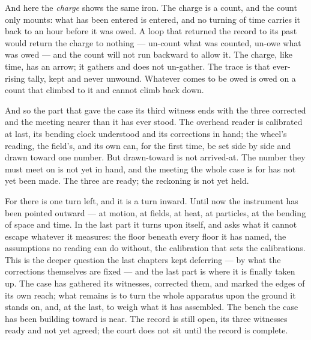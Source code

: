 And here the \emph{charge} shows the same iron. The charge is a count, and the count only mounts: what has been
entered is entered, and no turning of time carries it back to an hour before it was owed. A loop that returned
the record to its past would return the charge to nothing --- un-count what was counted, un-owe what was owed
--- and the count will not run backward to allow it. The charge, like time, has an arrow; it gathers and does
not un-gather. The trace is that ever-rising tally, kept and never unwound. Whatever comes to be owed is owed on
a count that climbed to it and cannot climb back down.

And so the part that gave the case its third witness ends with the three corrected and the meeting nearer than
it has ever stood. The overhead reader is calibrated at last, its bending clock understood and its corrections
in hand; the wheel's reading, the field's, and its own can, for the first time, be set side by side and drawn
toward one number. But drawn-toward is not arrived-at. The number they must meet on is not yet in hand, and the
meeting the whole case is for has not yet been made. The three are ready; the reckoning is not yet held.

For there is one turn left, and it is a turn inward. Until now the instrument has been pointed outward --- at
motion, at fields, at heat, at particles, at the bending of space and time. In the last part it turns upon
itself, and asks what it cannot escape whatever it measures: the floor beneath every floor it has named, the
assumptions no reading can do without, the calibration that sets the calibrations. This is the deeper question
the last chapters kept deferring --- by what the corrections themselves are fixed --- and the last part is where
it is finally taken up. The case has gathered its witnesses, corrected them, and marked the edges of its own
reach; what remains is to turn the whole apparatus upon the ground it stands on, and, at the last, to weigh what
it has assembled. The bench the case has been building toward is near. The record is still open, its three
witnesses ready and not yet agreed; the court does not sit until the record is complete.

